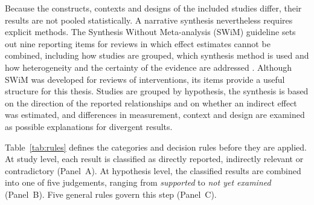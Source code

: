 Because the constructs, contexts and designs of the included studies differ, their results are not pooled statistically. A narrative synthesis nevertheless requires explicit methods. The Synthesis Without Meta-analysis (SWiM) guideline sets out nine reporting items for reviews in which effect estimates cannot be combined, including how studies are grouped, which synthesis method is used and how heterogeneity and the certainty of the evidence are addressed \parencite{campbell2020}. Although SWiM was developed for reviews of interventions, its items provide a useful structure for this thesis. Studies are grouped by hypothesis, the synthesis is based on the direction of the reported relationships and on whether an indirect effect was estimated, and differences in measurement, context and design are examined as possible explanations for divergent results.

Table~\ref{tab:rules} defines the categories and decision rules before they are applied. At study level, each result is classified as directly reported, indirectly relevant or contradictory (Panel~A). At hypothesis level, the classified results are combined into one of five judgements, ranging from \textit{supported} to \textit{not yet examined} (Panel~B). Five general rules govern this step (Panel~C).

